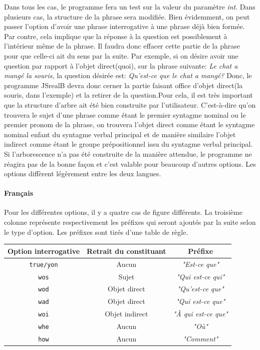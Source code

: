 \documentclass[11pt]{article} %
\newcommand{\system}[1]{\textsf{#1}}
\newcommand{\JSB}{\system{JSrealB}}
\newcommand{\real}[1]{\emph{#1}}
\begin{document}
Dans tous les cas, le programme fera un test sur la valeur du paramètre
\emph{int}. Dans plusieurs cas, la structure de la phrase sera modifiée.
Bien évidemment, on peut passer l'option d'avoir une phrase interrogative
à une phrase déjà bien formée. Par contre, cela implique que la réponse
à la question est possiblement à l'intérieur même de la phrase. Il
faudra donc effacer cette partie de la phrase pour que celle-ci ait
du sens par la suite. Par exemple, si on désire avoir une question
par rapport à l'objet direct(quoi), sur la phrase suivante: \emph{Le
chat a mangé la souris, }la question désirée est: \emph{Qu'est-ce
que le chat a mangé?} Donc, le programme \JSB{} devra donc cerner
la partie faisant office d'objet direct(la souris, dans l'exemple)
et la retirer de la question.Pour cela, il est très important que
la structure d'arbre ait été bien construite par l'utilisateur. C'est-à-dire
qu'on trouvera le sujet d'une phrase comme étant le premier syntagme
nominal ou le premier pronom de la phrase, on trouvera l'objet direct
comme étant le syntagme nominal enfant du syntagme verbal principal
et de manière similaire l'objet indirect comme étant le groupe prépositionnel
issu du syntagme verbal principal. Si l'arborescence n'a pas été construite
de la manière attendue, le programme ne réagira pas de la bonne façon
et c'est valable pour beaucoup d'autres options. Les options diffèrent
légèrement entre les deux langues.

\paragraph{Français}

Pour les différentes options, il y a quatre cas de figure différents.
La troisième colonne représente respectivement les préfixes qui seront
ajoutés par la suite selon le type d'option. Les préfixes sont tirés
d'une table de règle.

\begin{tabular}{|c|c|c|}
\hline 
Option interrogative & Retrait du constituant & Préfixe\\
\hline 
\hline 
\texttt{true/yon} & Aucun & \real{"Est-ce que"}\\
\hline 
\texttt{wos} & Sujet & \real{"Qui est-ce qui"}\\
\hline 
\texttt{wod} & Objet direct & \real{"Qu'est-ce que"}\\
\hline 
\texttt{wad} & Objet direct & \real{"Qui est-ce que"}\\
\hline 
\texttt{woi} & Objet indirect & \real{"À qui est-ce que"}\\
\hline 
\texttt{whe} & Aucun & \real{"Où"}\\
\hline 
\texttt{how} & Aucun & \real{"Comment"}\\
\hline 
\end{tabular}
\end{document}

